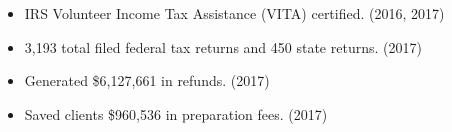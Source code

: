 \accomplishments
\begin{itemize}[leftmargin=*]
    \item IRS Volunteer Income Tax Assistance (VITA) certified. (2016, 2017)
    \item 3,193 total filed federal tax returns and 450 state returns. (2017) 
    \item Generated \$6,127,661 in refunds. (2017) 
    \item Saved clients \$960,536 in preparation fees. (2017) 
\end{itemize}